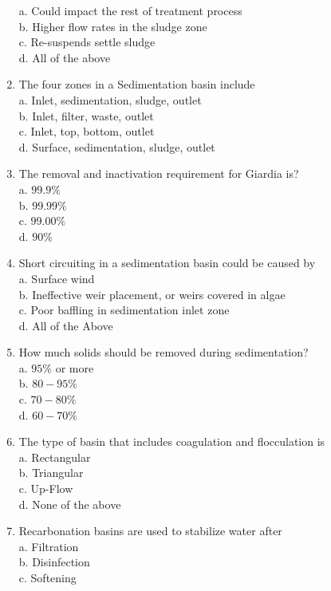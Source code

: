 \begin{enumerate}
a. Could impact the rest of treatment process\\
b. Higher flow rates in the sludge zone\\
c. Re-suspends settle sludge\\
d. All of the above\\
\item The four zones in a Sedimentation basin include\\
a. Inlet, sedimentation, sludge, outlet\\
b. Inlet, filter, waste, outlet\\
c. Inlet, top, bottom, outlet\\
d. Surface, sedimentation, sludge, outlet\\
\item The removal and inactivation requirement for Giardia is?\\
a. $99.9 \%$\\
b. $99.99 \%$\\
c. $99.00 \%$\\
d. $90 \%$\\
\item Short circuiting in a sedimentation basin could be caused by\\
a. Surface wind\\
b. Ineffective weir placement, or weirs covered in algae\\
c. Poor baffling in sedimentation inlet zone\\
d. All of the Above\\
\item How much solids should be removed during sedimentation?\\
a. $95 \%$ or more\\
b. $80-95 \%$\\
c. $70-80 \%$\\
d. $60-70 \%$\\
\item The type of basin that includes coagulation and flocculation is\\
a. Rectangular\\
b. Triangular\\
c. Up-Flow\\
d. None of the above\\
\item Recarbonation basins are used to stabilize water after\\
a. Filtration\\
b. Disinfection\\
c. Softening\\

\end{enumerate}
